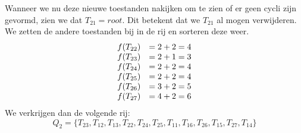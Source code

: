 \documentclass[alternative-exam.tex]{subfiles}
\begin{document}
Wanneer we nu deze nieuwe toestanden nakijken om te zien of er geen cycli zijn gevormd, zien we dat $T_{21} = root$. Dit betekent dat we $T_{21}$ al mogen verwijderen. We zetten de andere toestanden bij in de rij en sorteren deze weer.
\[
\begin{array}{c c}
f(T_{22}) &= 2+ 2 = 4\\
f(T_{23}) &= 2+ 1 = 3\\
f(T_{24}) &= 2+ 2 = 4\\
f(T_{25}) &= 2+ 2 = 4\\
f(T_{26}) &= 3+ 2 = 5\\
f(T_{27}) &= 4+ 2 = 6\\
\end{array}
\]
We verkrijgen dan de volgende rij:
\[
Q_2 = \{T_{23}, T_{12}, T_{13}, T_{22}, T_{24}, T_{25}, T_{11}, T_{16}, T_{26}, T_{15}, T_{27}, T_{14}\}
\]
\end{document}
